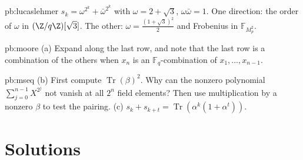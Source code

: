 \begin{hint}{pb:lucaslehmer}
$s_k=\omega^{2^k}+\bar\omega^{2^k}$ with $\omega=2+\sqrt3$, $\omega\bar\omega=1$. One direction: the order of $\omega$ in
$(\Z/q\Z)[\sqrt3]$. The other: $\omega=\frac{(1+\sqrt3)^2}2$ and Frobenius in $\mathbb F_{M_p^2}$.
\end{hint}

\begin{hint}{pb:moore}
(a) Expand along the last row, and note that the last row is a combination of the others when $x_n$ is an $\mathbb F_q$-combination
of $x_1,\dots,x_{n-1}$.
\end{hint}

\begin{hint}{pb:mseq}
(b) First compute $\operatorname{Tr}(\beta)^2$. Why can the nonzero
polynomial $\sum_{j=0}^{n-1}X^{2^j}$ not vanish at all $2^n$ field elements?
Then use multiplication by a nonzero $\beta$ to test the pairing.
(c) $s_k+s_{k+t}=\operatorname{Tr}(\alpha^k(1+\alpha^t))$.
\end{hint}

\section{Solutions}

